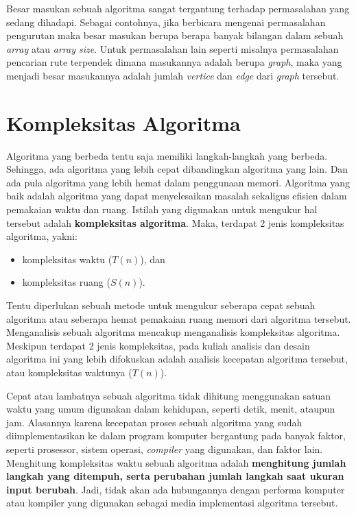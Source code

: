 Besar masukan sebuah algoritma sangat tergantung terhadap permasalahan yang sedang dihadapi. Sebagai contohnya, jika berbicara mengenai permasalahan pengurutan maka besar masukan berupa berapa banyak bilangan dalam sebuah \textit{array} atau \textit{array size}. Untuk permasalahan lain seperti misalnya permasalahan pencarian rute terpendek dimana masukannya adalah berupa \textit{graph}, maka yang menjadi besar masukannya adalah jumlah \textit{vertice} dan \textit{edge} dari \textit{graph} tersebut. 

\section{Kompleksitas Algoritma}
Algoritma yang berbeda tentu saja memiliki langkah-langkah yang berbeda. Sehingga, ada algoritma yang lebih cepat dibandingkan algoritma yang lain. Dan ada pula algoritma yang lebih hemat dalam penggunaan memori. Algoritma yang baik adalah algoritma yang dapat menyelesaikan masalah  sekaligus efisien dalam pemakaian waktu dan ruang. Istilah yang digunakan untuk mengukur hal tersebut adalah \textbf{kompleksitas algoritma}. Maka, terdapat 2 jenis kompleksitas algoritma, yakni:

\begin{itemize}
    \item kompleksitas waktu ($T(n)$), dan
    \item kompleksitas ruang ($S(n)$).
\end{itemize}

Tentu diperlukan sebuah metode untuk mengukur seberapa cepat sebuah algoritma atau seberapa hemat pemakaian ruang memori dari algoritma tersebut. Menganalisis sebuah algoritma mencakup menganalisis kompleksitas algoritma. Meskipun terdapat 2 jenis kompleksitas, pada kuliah analisis dan desain algoritma ini yang lebih difokuskan adalah analisis kecepatan algoritma tersebut, atau kompleksitas waktunya ($T(n)$).

Cepat atau lambatnya sebuah algoritma tidak dihitung menggunakan satuan waktu yang umum digunakan dalam kehidupan, seperti detik, menit, ataupun jam. Alasannya karena kecepatan proses sebuah algoritma yang sudah diimplementasikan ke dalam program komputer bergantung pada banyak faktor, seperti prosessor, sistem operasi, \textit{compiler} yang digunakan, dan faktor lain. Menghitung kompleksitas waktu sebuah algoritma adalah \textbf{menghitung jumlah langkah yang ditempuh, serta perubahan jumlah langkah saat ukuran input berubah}. Jadi, tidak akan ada hubungannya dengan performa komputer atau kompiler yang digunakan sebagai media implementasi algoritma tersebut.

